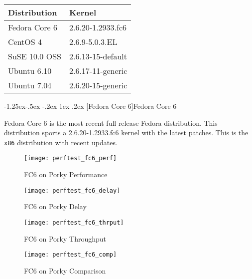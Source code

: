 \documentclass[letterpaper,final,notitlepage,twocolumn,10pt,twoside]{article}
\makeatletter
\renewcommand\subsubsection{\@startsection{subsubsection}{3}{\z@}%
                                     {-1.25ex\@plus -.5ex \@minus -.2ex}%
                                     {1ex \@plus .2ex}%
                                     {\normalfont\normalsize\bfseries}}
\makeatother
\begin{document}
\begin{tabular}{ll}\\
Distribution & Kernel\\
\hline
Fedora Core 6 & 2.6.20-1.2933.fc6\\
CentOS 4 & 2.6.9-5.0.3.EL\\
SuSE 10.0 OSS & 2.6.13-15-default\\
Ubuntu 6.10 & 2.6.17-11-generic\\
Ubuntu 7.04 & 2.6.20-15-generic\\
\end{tabular}

\subsubsection[Fedora Core 6]{Fedora Core 6}

Fedora Core 6 is the most recent full release Fedora distribution.  This
distribution sports a 2.6.20-1.2933.fc6 kernel with the latest patches.  This
is the \texttt{x86} distribution with recent updates.

\begin{figure}[p]
\texttt{[image: perftest\_fc6\_perf]}
\caption[FC6 on Porky Performance]{FC6 on Porky Performance}
\label{figure:fc6perf}
\end{figure}

\begin{figure}[p]
\texttt{[image: perftest\_fc6\_delay]}
\caption[FC6 on Porky Delay]{FC6 on Porky Delay}
\label{figure:fc6delay}
\end{figure}

\begin{figure}[p]
\texttt{[image: perftest\_fc6\_thrput]}
\caption[FC6 on Porky Throughput]{FC6 on Porky Throughput}
\label{figure:fc6thrput}
\end{figure}

\begin{figure}[p]
\texttt{[image: perftest\_fc6\_comp]}
\caption[FC6 on Porky Comparison]{FC6 on Porky Comparison}
\label{figure:fc6comp}
\end{figure}
\end{document}
